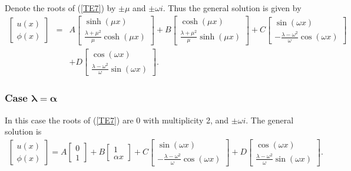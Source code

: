 \documentclass[../../main.tex]{subfiles}
\begin{document}
Denote the roots of (\ref{TE7}) by $\pm \mu$ and $\pm \omega i$. Thus the general solution is given by
\begin{eqnarray*}
\begin{bmatrix}
u(x)\\ \phi(x)
\end{bmatrix}
&=&
A
\begin{bmatrix}
\sinh (\mu x) \\ \frac{\lambda+\mu^{2}}{\mu}\cosh (\mu x)
\end{bmatrix}
+
B
\begin{bmatrix}
\cosh (\mu x) \\ \frac{\lambda+\mu^{2}}{\mu}\sinh (\mu x)
\end{bmatrix}
+
C
\begin{bmatrix}
\sin (\omega x) \\ -\frac{\lambda-\omega^{2}}{\omega}\cos (\omega x)
\end{bmatrix}\\
&&
+
D
\begin{bmatrix}
\cos (\omega x) \\ \frac{\lambda-\omega^{2}}{\omega}\sin (\omega x)
\end{bmatrix}.
\end{eqnarray*}

\subsubsection{Case $\boldsymbol{ \lambda=\alpha}$}

In this case the roots of (\ref{TE7}) are $0$ with multiplicity 2, and $\pm \omega i$. The general solution is
\begin{eqnarray*}
	\begin{bmatrix}
		u(x)\\ \phi(x)
	\end{bmatrix}
	=
	A
	\begin{bmatrix}
		0 \\1
	\end{bmatrix}
	+
	B
	\begin{bmatrix}
		1 \\ \alpha x
	\end{bmatrix}
	+
	C
	\begin{bmatrix}
		\sin (\omega x) \\ -\frac{\lambda-\omega^{2}}{\omega}\cos (\omega x)
	\end{bmatrix}
	+
	D
	\begin{bmatrix}
		\cos (\omega x) \\ \frac{\lambda-\omega^{2}}{\omega}\sin (\omega x)
	\end{bmatrix}.\label{T9}
\end{eqnarray*}
\end{document}
